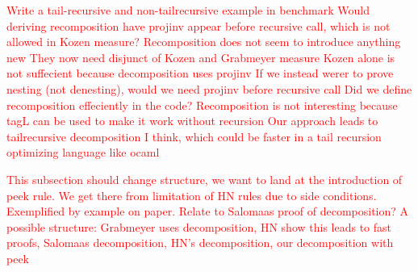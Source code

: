 \documentclass[a4paper,UKenglish,cleveref, autoref, thm-restate]{lipics-v2021}
\newcommand\mycomment[1]{\textcolor{red}{#1}}
\begin{document}
\mycomment{Write a tail-recursive and non-tailrecursive example in benchmark}
\mycomment{Would deriving recomposition have projinv appear before recursive call, which is not allowed in Kozen measure? Recomposition does not seem to introduce anything new}
\mycomment{They now need disjunct of Kozen and Grabmeyer measure}
\mycomment{Kozen alone is not suffecient because decomposition uses projinv}
\mycomment{If we instead werer to prove nesting (not denesting), would we need projinv before recursive call}
\mycomment{Did we define recomposition effeciently in the code?}
\mycomment{Recomposition is not interesting because tagL can be used to make it work without recursion}
\mycomment{Our approach leads to tailrecursive decomposition I think, which could be faster in a tail recursion optimizing language like ocaml}



\mycomment{This subsection should change structure, we want to land at the introduction of peek rule. We get there from limitation of HN rules due to side conditions. Exemplified by example on paper. Relate to Salomaas proof of decomposition? A possible structure: Grabmeyer uses decomposition, HN show this leads to fast proofs, Salomaas decomposition, HN's decomposition, our decomposition with peek}
\end{document}
